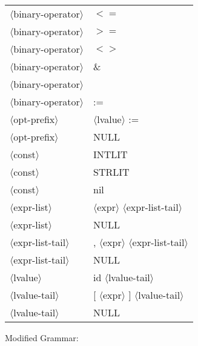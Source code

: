 \documentclass[11pt, fleqn]{article}
\newcommand{\atag}[1]{$\langle$#1$\rangle$}
\begin{document}
\begin{longtable}{l|l}
\atag{binary-operator}			&	$<=$	\\
\atag{binary-operator}			&	$>=$	\\
\atag{binary-operator}			&	$<>$	\\
\atag{binary-operator}			&	\&	\\
\atag{binary-operator}			&	\textbar		\\
\atag{binary-operator}			&	:=	\\
\atag{opt-prefix}				&	\atag{lvalue} :=		\\
\atag{opt-prefix}				&	NULL		\\
\atag{const}						&	INTLIT		\\
\atag{const}						&	STRLIT		\\
\atag{const}						&	nil		\\
\atag{expr-list}					&	\atag{expr} \atag{expr-list-tail}		\\
\atag{expr-list}					&	NULL		\\
\atag{expr-list-tail}			&	, \atag{expr} \atag{expr-list-tail}		\\
\atag{expr-list-tail}			&	NULL		\\
\atag{lvalue}					&	id \atag{lvalue-tail}		\\
\atag{lvalue-tail}				&	[ \atag{expr} ] \atag{lvalue-tail}		\\
\atag{lvalue-tail}				&	NULL		\\
\end{longtable}

Modified Grammar:
\end{document}
